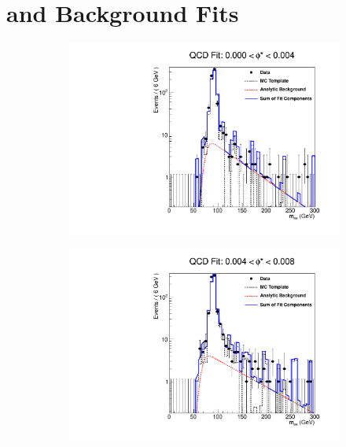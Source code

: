 \chapter{\texorpdfstring{\QCDjets and \wjets}{QCD multi-jet and W+Jets} Background Fits}
\label{app:qcd_fits}

\begin{figure}[!htbp]
    \centering
    \begin{subfigure}[b]{\SideBySidePlotWidth}
        \includegraphics[width=\linewidth]{figures/qcd_fits/qcd_fit_plot_for_01.pdf}
        \caption{}
        \label{fig:qcd_fit_01}
    \end{subfigure}%
    \begin{subfigure}[b]{\SideBySidePlotWidth}
        \includegraphics[width=\linewidth]{figures/qcd_fits/qcd_fit_plot_for_02.pdf}

\end{subfigure}
\end{figure}
